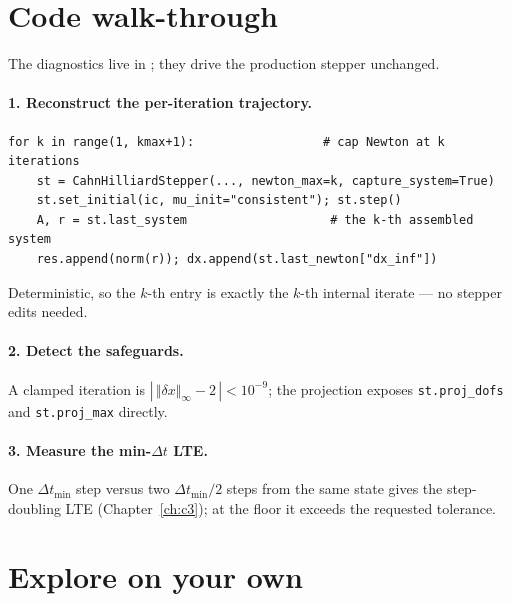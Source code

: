 \section{Code walk-through}

The diagnostics live in ; they drive the production
stepper unchanged.

\paragraph{1. Reconstruct the per-iteration trajectory.}
\begin{lstlisting}
for k in range(1, kmax+1):                  # cap Newton at k iterations
    st = CahnHilliardStepper(..., newton_max=k, capture_system=True)
    st.set_initial(ic, mu_init="consistent"); st.step()
    A, r = st.last_system                    # the k-th assembled system
    res.append(norm(r)); dx.append(st.last_newton["dx_inf"])
\end{lstlisting}
Deterministic, so the $k$-th entry is exactly the $k$-th internal iterate --- no
stepper edits needed.

\paragraph{2. Detect the safeguards.} A clamped iteration is
$|\,\Vert\delta x\Vert_\infty-2\,|<10^{-9}$; the projection exposes
\texttt{st.proj\_dofs} and \texttt{st.proj\_max} directly.

\paragraph{3. Measure the min-$\Delta t$ LTE.} One $\Delta t_{\min}$ step versus
two $\Delta t_{\min}/2$ steps from the same state gives the step-doubling LTE
(Chapter~\ref{ch:c3}); at the floor it exceeds the requested tolerance.

\section{Explore on your own}



